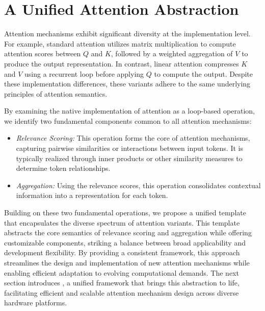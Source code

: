 \section{A Unified Attention Abstraction}
\label{sec:attn}
Attention mechanisms exhibit significant diversity at the implementation level. For example, standard attention utilizes matrix multiplication to compute attention scores between $Q$ and $K$, followed by a weighted aggregation of $V$ to produce the output representation. In contrast, linear attention compresses $K$ and $V$ using a recurrent loop before applying $Q$ to compute the output. Despite these implementation differences, these variants adhere to the same underlying principles of attention semantics.

By examining the native implementation of attention as a loop-based operation, we identify two fundamental components common to all attention mechanisms:

\begin{itemize}[noitemsep,topsep=0pt, left=0pt]
    \item \textit{Relevance Scoring:} This operation forms the core of attention mechanisms, capturing pairwise similarities or interactions between input tokens. It is typically realized through inner products or other similarity measures to determine token relationships.
    \item \textit{Aggregation:} Using the relevance scores, this operation consolidates contextual information into a representation for each token. 
\end{itemize}

Building on these two fundamental operations, we propose a unified template that encapsulates the diverse spectrum of attention variants. This template abstracts the core semantics of relevance scoring and aggregation while offering customizable components, striking a balance between broad applicability and development flexibility. By providing a consistent framework, this approach streamlines the design and implementation of new attention mechanisms while enabling efficient adaptation to evolving computational demands. The next section introduces \oursys{}, a unified framework that brings this abstraction to life, facilitating efficient and scalable attention mechanism design across diverse hardware platforms.


